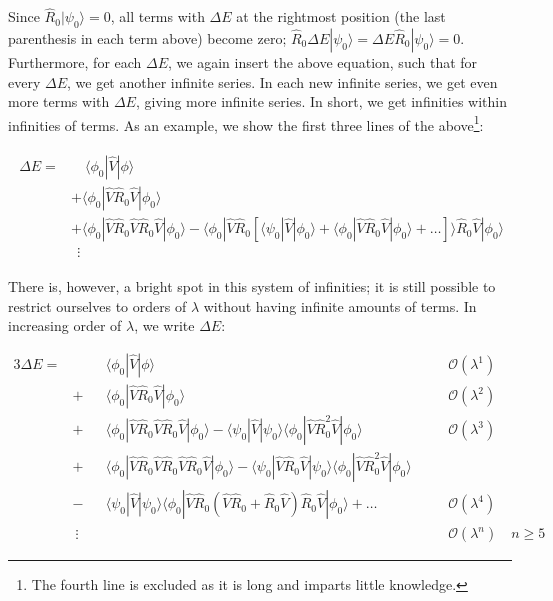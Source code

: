 \documentclass[10pt,twoside]{report}
\begin{document}
	Since $\hat{R}_0|\psi_0\rangle = 0$, all terms with $\Delta E$ at the rightmost position (the last parenthesis in each term above) become zero; $\hat{R}_0\Delta E|\psi_0\rangle = \Delta E\hat{R}_0|\psi_0\rangle = 0$. Furthermore, for each $\Delta E$, we again insert the above equation, such that for every $\Delta E$, we get another infinite series. In each new infinite series, we get even more terms with $\Delta E$, giving more infinite series. In short, we get infinities within infinities of terms. As an example, we show the first three lines of the above\footnote{The fourth line is excluded as it is long and imparts little knowledge.}:
	
	\begin{align}
		\begin{split}
			\Delta E = &\quad\langle\phi_0|\hat{V}|\phi\rangle \\
			&+ \langle\phi_0|\hat{V}\hat{R}_0\hat{V}|\phi_0\rangle\\
			&+ \langle\phi_0|\hat{V}\hat{R}_0\hat{V}\hat{R}_0\hat{V}|\phi_0\rangle - \langle\phi_0|\hat{V}\hat{R}_0\left[\langle\psi_0|\hat{V}|\phi_0\rangle + \langle\phi_0|\hat{V}\hat{R}_0\hat{V}|\phi_0\rangle + \ldots\right]\rangle\hat{R}_0\hat{V}|\phi_0\rangle\\
			&\:\:\vdots
		\end{split}
	\end{align}
	
	There is, however, a bright spot in this system of infinities; it is still possible to restrict ourselves to orders of $\lambda$ without having infinite amounts of terms. In increasing order of $\lambda$, we write $\Delta E$:
	
	\begin{alignat*}{3}
			\Delta E = &\:&&\langle\phi_0|\hat{V}|\phi\rangle \quad&&\mathcal{O}(\lambda^1)\\
			&+&& \langle\phi_0|\hat{V}\hat{R}_0\hat{V}|\phi_0\rangle	\quad&&\mathcal{O}(\lambda^2)\\
			&+&& \langle\phi_0|\hat{V}\hat{R}_0\hat{V}\hat{R}_0\hat{V}|\phi_0\rangle - \langle\psi_0|\hat{V}|\psi_0\rangle\langle\phi_0|\hat{V}\hat{R}_0^2\hat{V}|\phi_0\rangle \quad&&\mathcal{O}(\lambda^3)\\
			&+&& \langle\phi_0|\hat{V}\hat{R}_0\hat{V}\hat{R}_0\hat{V}\hat{R}_0\hat{V}|\phi_0\rangle - \langle\psi_0|\hat{V}\hat{R}_0\hat{V}|\psi_0\rangle\langle\phi_0|\hat{V}\hat{R}_0^2\hat{V}|\phi_0\rangle \quad&&\\
			&-&& \langle\psi_0|\hat{V}|\psi_0\rangle\langle\phi_0|\hat{V}\hat{R}_0\left( \hat{V}\hat{R}_0 + \hat{R}_0\hat{V} \right)\hat{R}_0\hat{V}|\phi_0\rangle + \ldots\quad&&\mathcal{O}(\lambda^4)\\
			&\:\vdots&& \quad&&\mathcal{O}(\lambda^n)\quad n\geq 5
	\end{alignat*}
	
\end{document}
